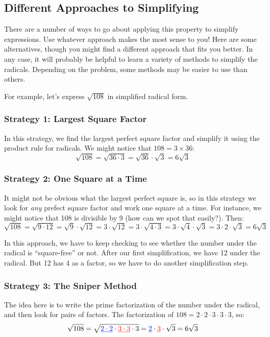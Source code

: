\subsection{Different Approaches to Simplifying}

There are a number of ways to go about applying this property to simplify expressions. Use whatever approach makes the most sense to you! Here are some alternatives, though you might find a different approach that fits you better. In any case, it will probably be helpful to learn a variety of methods to simplify the radicals. Depending on the problem, some methods may be easier to use than others.

For example, let's express $\sqrt{108}$ in simplified radical form.

\subsubsection{Strategy 1: Largest Square Factor}

In this strategy, we find the largest perfect square factor and simplify it using the product rule for radicals. We might notice that $108 = 3 \times 36$: \[\sqrt{108} = \sqrt{36 \cdot 3} = \sqrt{36} \cdot \sqrt{3} = 6\sqrt{3}\]

\subsubsection{Strategy 2: One Square at a Time}

It might not be obvious what the largest perfect square is, so in this strategy we look for \textit{any} prefect square factor and work one square at a time. For instance, we might notice that 108 is divisible by 9 (how can we spot that easily?). Then: \[\sqrt{108} = \sqrt{9 \cdot 12} = \sqrt{9} \cdot \sqrt{12} = 3 \cdot \sqrt{12} = 3 \cdot \sqrt{4 \cdot 3} = 3 \cdot \sqrt{4} \cdot \sqrt{3} = 3 \cdot 2 \cdot \sqrt{3} = 6\sqrt{3}\]

In this approach, we have to keep checking to see whether the number under the radical is ``square-free'' or not. After our first simplification, we have 12 under the radical. But 12 has 4 as a factor, so we have to do another simplification step.

\subsubsection{Strategy 3: The Sniper Method}

The idea here is to write the prime factorization of the number under the radical, and then look for pairs of factors. The factorization of $108 = 2 \cdot 2 \cdot 3 \cdot 3 \cdot 3$, so: \[\sqrt{108} = \sqrt{\underline{\color{blue}2 \cdot 2} \cdot \underline{\color{red}3 \cdot 3} \cdot 3} = \underline{\color{blue}2} \cdot \underline{\color{red}3} \cdot \sqrt{3} = 6\sqrt{3} \]

